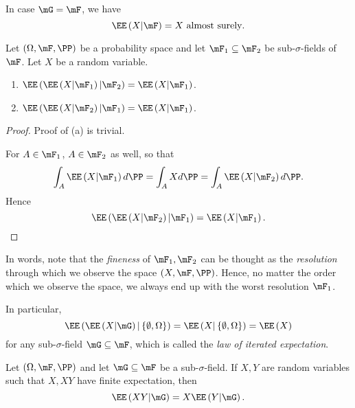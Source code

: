 \documentclass[stat901]{subfiles}
\begin{document}
    \rruleline

    \np In case $\mG=\mF$, we have
    \begin{equation*}
        \EE\left( X|\mF \right) = X \text{ almost surely}.
    \end{equation*}
    
    \begin{theorem}{}
        Let $\left( \Omega,\mF,\PP \right)$ be a probability space and let $\mF_1\subseteq\mF_2$ be sub-$\sigma$-fields of $\mF$. Let $X$ be a random variable.
        \begin{enumerate}
            \item $\EE\left( \EE\left( X|\mF_1 \right)|\mF_2 \right) = \EE\left( X|\mF_1 \right)$.
            \item $\EE\left( \EE\left( X|\mF_2 \right)|\mF_1 \right) = \EE\left( X|\mF_1 \right)$.
        \end{enumerate}
    \end{theorem}

    \begin{proof}
        Proof of (a) is trivial.

        For $A\in\mF_1$, $A\in\mF_2$ as well, so that
        \begin{equation*}
            \int_A\EE\left( X|\mF_1 \right)d\PP = \int_AXd\PP = \int_A\EE\left( X|\mF_2 \right)d\PP.
        \end{equation*}
        Hence
        \begin{equation*}
            \EE\left( \EE\left( X|\mF_2 \right)|\mF_1 \right) = \EE\left( X|\mF_1 \right).
        \end{equation*}
    \end{proof}

    \np In words, note that the \textit{fineness} of $\mF_1,\mF_2$ can be thought as the \textit{resolution} through which we observe the space $\left( X,\mF,\PP \right)$. Hence, no matter the order which we observe the space, we always end up with the worst resolution $\mF_1$.

    \np In particular,
    \begin{equation*}
        \EE\left( \EE\left( X|\mG \right)|\left\lbrace \emptyset,\Omega \right\rbrace \right) = \EE\left( X|\left\lbrace \emptyset,\Omega \right\rbrace \right) = \EE\left( X \right)
    \end{equation*}
    for any sub-$\sigma$-field $\mG\subseteq\mF$, which is called the \textit{law of iterated expectation}.

    \begin{theorem}{}
        Let $\left( \Omega,\mF,\PP \right)$ and let $\mG\subseteq\mF$ be a sub-$\sigma$-field. If $X,Y$ are random variables such that $X,XY$ have finite expectation, then
        \begin{equation*}
            \EE\left( XY|\mG \right) = X\EE\left( Y|\mG \right).
        \end{equation*}
    \end{theorem}
\end{document}
